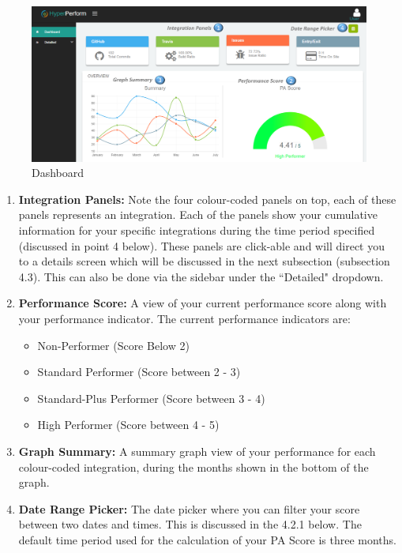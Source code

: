 \documentclass[11pt,a4paper]{article}
\begin{document}
\begin{figure}[H]
	\begin{center}
		\includegraphics[scale=0.27]{../Images/Getting_Started/dash_numbered.png}
		\caption{Dashboard}
	\end{center}
\end{figure}

\begin{enumerate}
	\item \textbf{Integration Panels:} Note the four colour-coded panels on top, each of these panels represents an integration. Each of the panels show your cumulative information for your specific integrations during the time period specified (discussed in point 4 below). These panels are click-able and will direct you to a details screen which will be discussed in the next subsection (subsection 4.3). This can also be done via the sidebar under the ``Detailed" dropdown.
	\item \textbf{Performance Score:} A view of your current performance score along with your performance indicator. The current performance indicators are:
	\begin{itemize}
		\item Non-Performer (Score Below 2)
		\item Standard Performer (Score between 2 - 3)
		\item Standard-Plus Performer (Score between 3 - 4)
		\item High Performer (Score between 4 - 5)
	\end{itemize}
	\item \textbf{Graph Summary:} A summary graph view of your performance for each colour-coded integration, during the months shown in the bottom of the graph.
	\item \textbf{Date Range Picker:} The date picker where you can filter your score between two dates and times. This is discussed in the 4.2.1 below. The default time period used for the calculation of your PA Score is three months. 
\end{enumerate}
\end{document}
